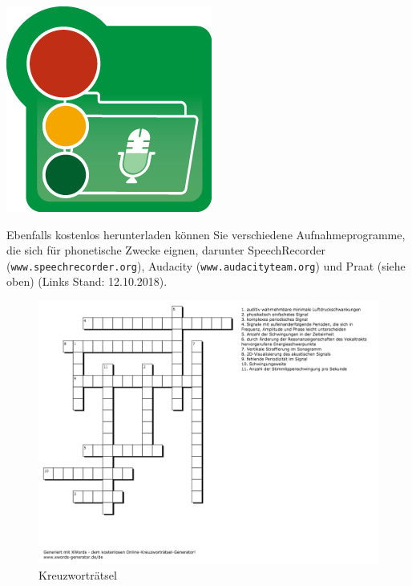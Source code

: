 \documentclass[11pt]{book}
\begin{document}
\begin {minipage} {0.1\textwidth}
\includegraphics[width=\textwidth]{grafiken/sprachaufnahme/speechrecorder.png}
\end{minipage}
\hspace{1cm}
\begin{minipage} {0.6\textwidth}
Ebenfalls kostenlos herunterladen können Sie verschiedene Aufnahmeprogramme, die sich für phonetische Zwecke eignen, darunter SpeechRecorder ({\tt www.speechrecorder.org}), Audacity  ({\tt www.audacityteam.org}) und Praat (siehe oben) (Links Stand: 12.10.2018).
\end {minipage}



\begin{figure}[htb]
\begin{center}
\includegraphics[width=1.2\textwidth]{grafiken/sprechen/kreuzwortraetsel}
\caption{Kreuzworträtsel}
\label{fig5}
\end{center}
\end{figure}
\end{document}
